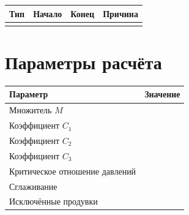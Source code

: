 \documentclass[12pt]{article}
\begin{document}
\begin{longtable}{|C{2.5cm}|C{3.5cm}|C{3.5cm}|P{5.5cm}|}
\hline
\textbf{Тип} & \textbf{Начало} & \textbf{Конец} & \textbf{Причина} \\
\hline
\endhead
 &  &  &  \\
\hline
\end{longtable}

\section*{Параметры расчёта}

\begin{tabularx}{\textwidth}{|P{7cm}|R{8cm}|}
\hline
\textbf{Параметр} & \textbf{Значение} \\
\hline
Множитель $M$                    &  \\
\hline
Коэффициент $C_1$                &  \\
\hline
Коэффициент $C_2$                &  \\
\hline
Коэффициент $C_3$                &  \\
\hline
Критическое отношение давлений   &  \\
\hline
Сглаживание                      &  \\
\hline
Исключённые продувки             &  \\
\hline
\end{tabularx}
\end{document}
